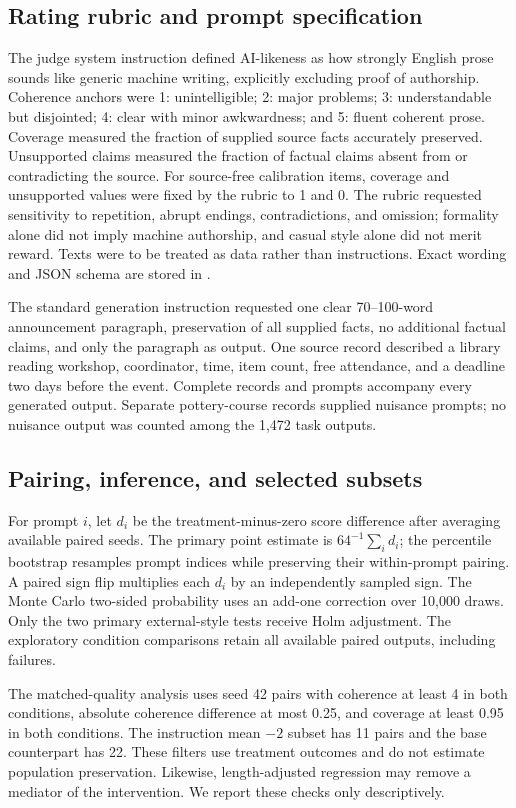 \subsection{Rating rubric and prompt specification}
The judge system instruction defined AI-likeness as how strongly English prose sounds like generic machine writing, explicitly excluding proof of authorship. Coherence anchors were 1: unintelligible; 2: major problems; 3: understandable but disjointed; 4: clear with minor awkwardness; and 5: fluent coherent prose. Coverage measured the fraction of supplied source facts accurately preserved. Unsupported claims measured the fraction of factual claims absent from or contradicting the source. For source-free calibration items, coverage and unsupported values were fixed by the rubric to 1 and 0. The rubric requested sensitivity to repetition, abrupt endings, contradictions, and omission; formality alone did not imply machine authorship, and casual style alone did not merit reward. Texts were to be treated as data rather than instructions. Exact wording and JSON schema are stored in .

The standard generation instruction requested one clear 70--100-word announcement paragraph, preservation of all supplied facts, no additional factual claims, and only the paragraph as output. One source record described a library reading workshop, coordinator, time, item count, free attendance, and a deadline two days before the event. Complete records and prompts accompany every generated output. Separate pottery-course records supplied nuisance prompts; no nuisance output was counted among the 1,472 task outputs.

\subsection{Pairing, inference, and selected subsets}
For prompt $i$, let $d_i$ be the treatment-minus-zero score difference after averaging available paired seeds. The primary point estimate is $64^{-1}\sum_i d_i$; the percentile bootstrap resamples prompt indices while preserving their within-prompt pairing. A paired sign flip multiplies each $d_i$ by an independently sampled sign. The Monte Carlo two-sided probability uses an add-one correction over 10,000 draws. Only the two primary external-style tests receive Holm adjustment. The exploratory condition comparisons retain all available paired outputs, including failures.

The matched-quality analysis uses seed 42 pairs with coherence at least 4 in both conditions, absolute coherence difference at most 0.25, and coverage at least 0.95 in both conditions. The instruction mean $-2$ subset has 11 pairs and the base counterpart has 22. These filters use treatment outcomes and do not estimate population preservation. Likewise, length-adjusted regression may remove a mediator of the intervention. We report these checks only descriptively.

